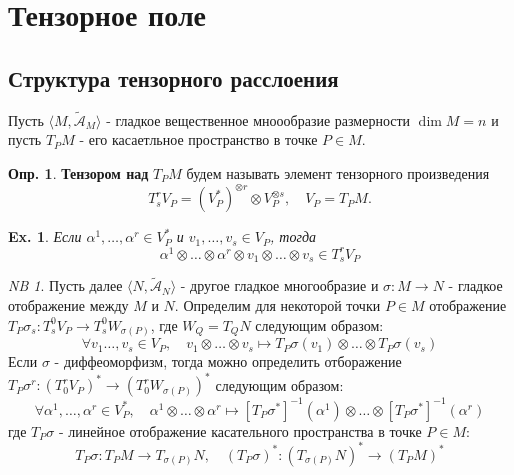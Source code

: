 \documentclass[12pt]{article}
\theoremstyle{plain}
\theoremstyle{lemma}
\theoremstyle{corollary}
\theoremstyle{proposition}
\theoremstyle{exercise}
\theoremstyle{example}
\newtheorem{example}{Ex.}
\theoremstyle{remark}
\newtheorem{remark}{NB}
\theoremstyle{definition}
\newtheorem{definition}{Опр.}
\newcommand\tld{\widetilde}
\begin{document}
\section{Тензорное поле}

\subsection{Структура тензорного расслоения}

Пусть $\langle M, \tld{\mathcal{A}}_M\rangle$ - гладкое вещественное мноообразие размерности $\dim M = n$ 
и пусть $T_PM$ - его касаетльное пространство в точке $P \in M$.

\begin{definition}
    \textbf{Тензором над} $T_PM$ будем называть элемент тензорного произведения
    \begin{equation*}
        T^r_sV_P = (V^\ast_P)^{\otimes r} \otimes V^{\otimes s}_P, \quad V_P = T_PM.
    \end{equation*}  
\end{definition}

\begin{example}
    Если $\alpha^1, \ldots, \alpha^r \in V_P^\ast$ и $v_1, \ldots, v_s \in V_P$, тогда
    \begin{equation*}
        \alpha^1 \otimes \ldots \otimes \alpha^r \otimes v_1 \otimes \ldots \otimes v_s \in T^r_sV_P
    \end{equation*}
\end{example}

\begin{remark}
    Пусть далее $\langle N, \tld{\mathcal{A}}_N\rangle$ - другое гладкое многообразие 
    и $\sigma: M \to N$ - гладкое отображение между $M$ и $N$. Определим для некоторой 
    точки $P \in M$ отображение $T_P \sigma_s: T^0_sV_P \to T^0_sW_{\sigma(P)}$, где 
    $W_Q = T_QN$ следующим образом:
    \begin{equation*}
        \forall v_1 \ldots, v_s \in V_P, \quad 
        v_1 \otimes \ldots \otimes v_s \mapsto T_P\sigma (v_1) \otimes \ldots \otimes T_P \sigma (v_s)
    \end{equation*}
    Если $\sigma$ - диффеоморфизм, тогда можно определить отборажение 
    $T_P \sigma^r: (T^r_0 V_P)^\ast \to (T^r_0 W_{\sigma(P)})^\ast$ следующим образом:
    \begin{equation*}
        \forall \alpha^1, \ldots, \alpha^r \in V_P^\ast, \quad 
        \alpha^1 \otimes \ldots \otimes \alpha^r \mapsto [T_P\sigma^\ast]^{-1} (\alpha^1) \otimes \ldots \otimes [T_P\sigma^\ast]^{-1}(\alpha^r)
    \end{equation*}
    где $T_P\sigma$ - линейное отображение касательного пространства в точке $P \in M$:
    \begin{equation*}
        T_P\sigma: T_PM \to T_{\sigma(P)}N, \quad (T_P\sigma)^\ast: (T_{\sigma(P)}N)^\ast \to (T_PM)^\ast 
    \end{equation*}
\end{remark}
\end{document}
